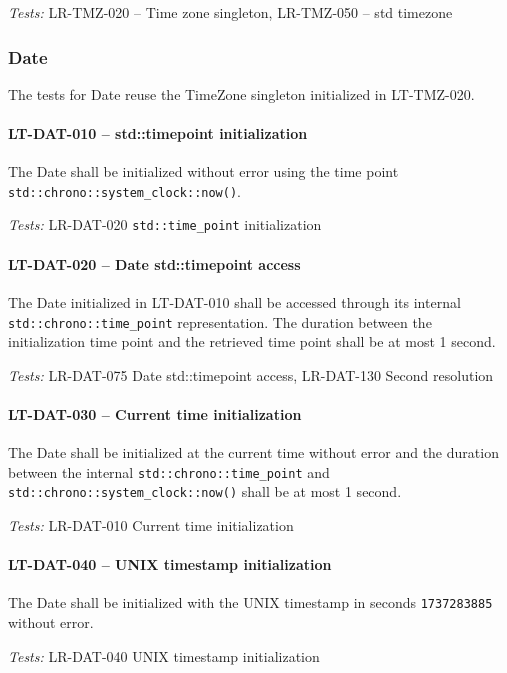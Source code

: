 \textit{Tests: } LR-TMZ-020 -- Time zone singleton,
                 LR-TMZ-050 -- std time\textunderscore zone

\subsubsection{Date}
The tests for Date reuse the TimeZone singleton initialized
in LT-TMZ-020.
                 
\paragraph{LT-DAT-010 -- std::time\textunderscore point initialization}
The Date shall be initialized without error using the time point
\lstinline{std::chrono::system_clock::now()}.

\textit{Tests: } LR-DAT-020 \lstinline{std::time_point} initialization

\paragraph{LT-DAT-020 -- Date std::time\textunderscore point access}
The Date initialized in LT-DAT-010 shall be accessed through its
internal \lstinline{std::chrono::time_point} representation.
The duration between the initialization time point and the retrieved
time point shall be at most 1 second.

\textit{Tests: } LR-DAT-075 Date std::time\textunderscore point access,
LR-DAT-130 Second resolution

\paragraph{LT-DAT-030 -- Current time initialization}
The Date shall be initialized at the current time without error
and the duration between the internal \lstinline{std::chrono::time_point}
and \lstinline{std::chrono::system_clock::now()} shall be at most 1 second.

\textit{Tests: } LR-DAT-010 Current time initialization

\paragraph{LT-DAT-040 -- UNIX timestamp initialization}
The Date shall be initialized with the UNIX timestamp in seconds
\lstinline{1737283885} without error.

\textit{Tests: } LR-DAT-040 UNIX timestamp initialization


